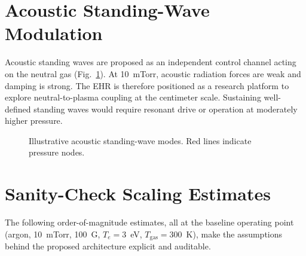 \documentclass[11pt]{article}
\begin{document}
\section{Acoustic Standing-Wave Modulation}
\label{sec:acoustic}

Acoustic standing waves are proposed as an independent control channel acting on the neutral gas (Fig.~\ref{fig:modes}). At 10~mTorr, acoustic radiation forces are weak and damping is strong. The EHR is therefore positioned as a research platform to explore neutral-to-plasma coupling at the centimeter scale. Sustaining well-defined standing waves would require resonant drive or operation at moderately higher pressure.

\begin{figure}[htbp]
\centering
{}
\caption{Illustrative acoustic standing-wave modes. Red lines indicate pressure nodes.}
\label{fig:modes}
\end{figure}

\section{Sanity-Check Scaling Estimates}
\label{sec:scaling}

The following order-of-magnitude estimates, all at the baseline operating point (argon, 10~mTorr, 100~G, $T_e = 3$~eV, $T_{\mathrm{gas}} = 300$~K), make the assumptions behind the proposed architecture explicit and auditable.
\end{document}
